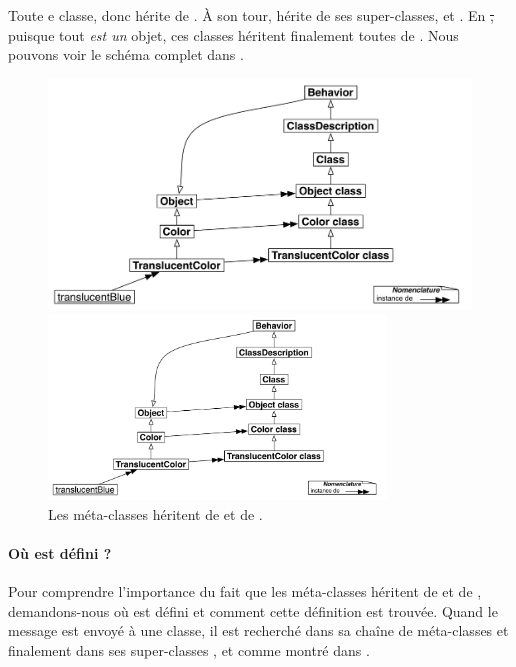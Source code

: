 \documentclass[a4paper,10pt,twoside]{book}
\begin{document}
Toute  e classe, donc hérite de .
À son tour,  hérite de ses super-classes,  et .
En \st, puisque tout \emph{est un} objet, ces classes héritent finalement toutes de .
Nous pouvons voir le schéma complet dans .

\begin{center}
\begin{figure}
\ifluluelse
	{\centerline{\includegraphics[width=\textwidth]{TranslucentBehavior}}}
	{\centerline{\includegraphics[width=0.8\textwidth]{TranslucentBehavior}}}
\caption{Les méta-classes héritent de  et de .}
\end{figure}
\end{center}


\paragraph{Où est défini ?}
Pour comprendre l'importance du fait que les méta-classes héritent de  et de , 
demandons-nous
où est défini  et comment cette définition est trouvée.
Quand le message  est envoyé à une classe, il est recherché dans sa chaîne de méta-classes et finalement dans ses super-classes ,  et  comme montré dans .
\end{document}
